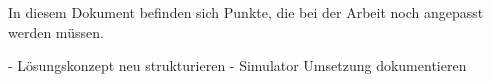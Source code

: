 
In diesem Dokument befinden sich Punkte, die bei der Arbeit noch angepasst werden müssen.


- Lösungskonzept neu strukturieren
- Simulator Umsetzung dokumentieren